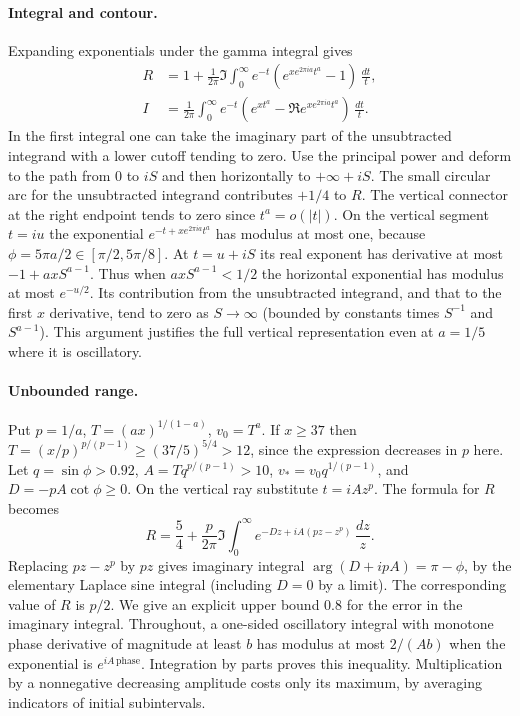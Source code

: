 \documentclass[11pt,a4paper]{article}
\numberwithin{equation}{section}
\begin{document}
\paragraph{Integral and contour.}
Expanding exponentials under the gamma integral gives
\begin{align*}
 R&=1+\frac1{2\pi}\Im\int_0^\infty e^{-t}
        (e^{x e^{2\pi ia}t^a}-1)\,\frac{dt}{t},\\
 I&=\frac1{2\pi}\int_0^\infty e^{-t}
        (e^{xt^a}-\Re e^{x e^{2\pi ia}t^a})\,\frac{dt}{t}.
\end{align*}
In the first integral one can take the imaginary part of the
unsubtracted integrand with a lower cutoff tending to zero.
Use the principal power and deform to the path from $0$ to $iS$
and then horizontally to $+\infty+iS$. The small circular arc
for the unsubtracted integrand contributes $+1/4$ to $R$. The
vertical connector at the right endpoint tends to zero since
$t^a=o(|t|)$. On the vertical segment $t=iu$ the exponential
$e^{-t+x e^{2\pi ia}t^a}$ has modulus at most one, because
$\phi=5\pi a/2\in[\pi/2,5\pi/8]$. At $t=u+iS$ its real exponent
has derivative at most $-1+axS^{a-1}$. Thus when $axS^{a-1}<1/2$
the horizontal exponential has modulus at most $e^{-u/2}$.
Its contribution from the unsubtracted integrand, and that to the first
$x$ derivative, tend to zero as $S\to\infty$ (bounded by constants
times $S^{-1}$ and $S^{a-1}$). This argument justifies the full
vertical representation even at $a=1/5$ where it is oscillatory.

\paragraph{Unbounded range.}
Put $p=1/a$, $T=(ax)^{1/(1-a)}$, $v_0=T^a$. If $x\ge37$ then
$T=(x/p)^{p/(p-1)}\ge(37/5)^{5/4}>12$, since the expression
decreases in $p$ here. Let $q=\sin\phi>0.92$,
$A=Tq^{p/(p-1)}>10$, $v_*=v_0 q^{1/(p-1)}$, and
$D=-pA\cot\phi\ge0$. On the vertical ray substitute $t=iAz^p$.
The formula for $R$ becomes
\[
 R=\frac54+\frac p{2\pi}\Im\int_0^\infty
         e^{-Dz+iA(pz-z^p)}\,\frac{dz}{z}.
\]
Replacing $pz-z^p$ by $pz$ gives imaginary integral
$\arg(D+ipA)=\pi-\phi$, by the elementary Laplace sine integral
(including $D=0$ by a limit). The corresponding value of $R$ is $p/2$.
We give an explicit upper bound $0.8$ for the error in the imaginary
integral. Throughout, a one-sided oscillatory integral with monotone
phase derivative of magnitude at least $b$ has modulus at most
$2/(Ab)$ when the exponential is $e^{iA\,\mathrm{phase}}$.
Integration by parts proves this inequality. Multiplication by a
nonnegative decreasing amplitude costs only its maximum, by averaging
indicators of initial subintervals.
\end{document}
